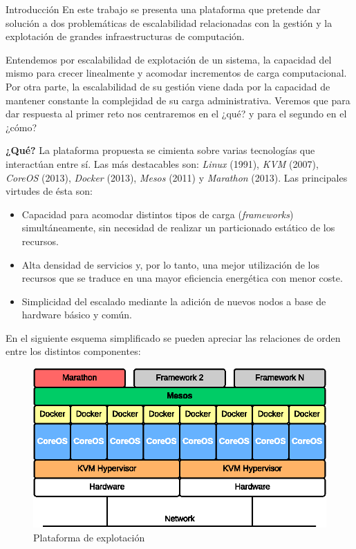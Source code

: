\documentclass[a4paper,12pt,spanish,final]{epsc_tfc_pfc}
\begin{document}
\begin{intro}{Introducción}
En este trabajo se presenta una plataforma que pretende dar solución a dos problemáticas de escalabilidad relacionadas con la gestión y la explotación de grandes infraestructuras de computación.

Entendemos por escalabilidad de explotación de un sistema, la capacidad del mismo para crecer linealmente y acomodar incrementos de carga computacional. Por otra parte, la escalabilidad de su gestión viene dada por la capacidad de mantener constante la complejidad de su carga administrativa. Veremos que para dar respuesta al primer reto nos centraremos en el ¿qué? y para el segundo en el ¿cómo?

\textbf{¿Qué?} La plataforma propuesta se cimienta sobre varias tecnologías que interactúan entre sí. Las más destacables son: \emph{Linux} (1991), \emph{KVM} (2007), \emph{CoreOS} (2013), \emph{Docker} (2013), \emph{Mesos} (2011) y \emph{Marathon} (2013). Las principales virtudes de ésta son:
\begin{itemize}
  \item Capacidad para acomodar distintos tipos de carga (\emph{frameworks}) simultáneamente, sin necesidad de realizar un particionado estático de los recursos.
  \item Alta densidad de servicios y, por lo tanto, una mejor utilización de los recursos que se traduce en una mayor eficiencia energética con menor coste.
  \item Simplicidad del escalado mediante la adición de nuevos nodos a base de hardware básico y común.
\end{itemize}

En el siguiente esquema simplificado se pueden apreciar las relaciones de orden entre los distintos componentes:\\

\begin{figure}[h]
  \centering
    \includegraphics[scale=1]{plataforma}
      \caption{Plataforma de explotación}
\end{figure}


\end{intro}
\end{document}
